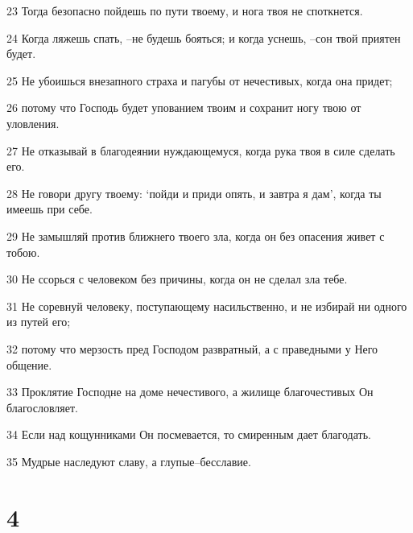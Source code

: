 \par 23 Тогда безопасно пойдешь по пути твоему, и нога твоя не споткнется.
\par 24 Когда ляжешь спать, --не будешь бояться; и когда уснешь, --сон твой приятен будет.
\par 25 Не убоишься внезапного страха и пагубы от нечестивых, когда она придет;
\par 26 потому что Господь будет упованием твоим и сохранит ногу твою от уловления.
\par 27 Не отказывай в благодеянии нуждающемуся, когда рука твоя в силе сделать его.
\par 28 Не говори другу твоему: `пойди и приди опять, и завтра я дам', когда ты имеешь при себе.
\par 29 Не замышляй против ближнего твоего зла, когда он без опасения живет с тобою.
\par 30 Не ссорься с человеком без причины, когда он не сделал зла тебе.
\par 31 Не соревнуй человеку, поступающему насильственно, и не избирай ни одного из путей его;
\par 32 потому что мерзость пред Господом развратный, а с праведными у Него общение.
\par 33 Проклятие Господне на доме нечестивого, а жилище благочестивых Он благословляет.
\par 34 Если над кощунниками Он посмевается, то смиренным дает благодать.
\par 35 Мудрые наследуют славу, а глупые--бесславие.

\chapter{4}

